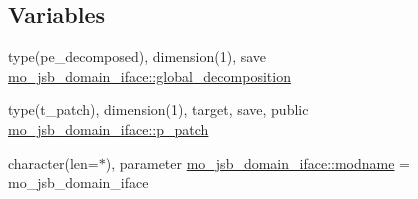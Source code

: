 \subsection*{Variables}
\begin{DoxyCompactItemize}
\item 
type(pe\+\_\+decomposed), dimension(1), save \hyperlink{namespacemo__jsb__domain__iface_af4a20b2bcbe28bcb3a12e209c85fa762}{mo\+\_\+jsb\+\_\+domain\+\_\+iface\+::global\+\_\+decomposition}
\item 
type(t\+\_\+patch), dimension(1), target, save, public \hyperlink{namespacemo__jsb__domain__iface_a0afd1d2a27a8d25a8e915997494b19ed}{mo\+\_\+jsb\+\_\+domain\+\_\+iface\+::p\+\_\+patch}
\item 
character(len=$\ast$), parameter \hyperlink{namespacemo__jsb__domain__iface_af1037ce2c7c80ed94354f71e9a8f33d0}{mo\+\_\+jsb\+\_\+domain\+\_\+iface\+::modname} = \textquotesingle{}mo\+\_\+jsb\+\_\+domain\+\_\+iface\textquotesingle{}
\end{DoxyCompactItemize}

